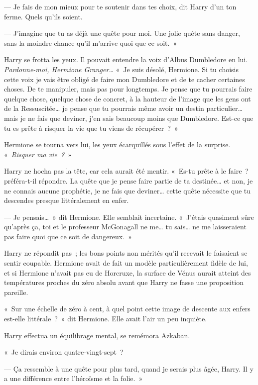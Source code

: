 --- Je fais de mon mieux pour te soutenir dans tes choix, dit Harry d'un ton ferme.
Quels qu'ils soient.

--- J'imagine que tu as déjà une quête pour moi.
Une jolie quête sans danger, sans la moindre chance qu'il m'arrive quoi que ce soit.~»

Harry se frotta les yeux.
Il pouvait entendre la voix d'Albus Dumbledore en lui.
\emph{Pardonne-moi, Hermione Granger…} «~Je suis désolé, Hermione.
Si tu choisis cette voix je vais être obligé de faire mon Dumbledore et de te cacher certaines choses.
De te manipuler, mais pas pour longtemps.
Je pense que tu pourrais faire quelque chose, quelque chose de concret, à la hauteur de l'image que les gens ont de la Ressuscitée… je pense que tu pourrais même avoir un destin particulier… mais je ne fais que deviner, j'en sais beaucoup moins que Dumbledore.
Est-ce que tu es prête à risquer la vie que tu viens de récupérer~?~»

Hermione se tourna vers lui, les yeux écarquillés sous l'effet de la surprise.
«~\emph{Risquer ma vie~?}~»

Harry ne hocha pas la tête, car cela aurait été mentir.
«~Es-tu prête à le faire~? préféra-t-il répondre.
La quête que je pense faire partie de ta destinée… et non, je ne connais aucune prophétie, je ne fais que deviner… cette quête nécessite que tu descendes presque littéralement en enfer.

--- Je pensais…~»
dit Hermione.
Elle semblait incertaine.
«~J'étais quasiment sûre qu'après ça, toi et le professeur McGonagall ne me… tu sais… ne me laisseraient pas faire quoi que ce soit de dangereux.~»

Harry ne répondit pas~; les bons points non mérités qu'il recevait le faisaient se sentir coupable.
Hermione avait de fait un modèle particulièrement fidèle de lui, et si Hermione n'avait pas eu de Horcruxe, la surface de Vénus aurait atteint des températures proches du zéro absolu avant que Harry ne fasse une proposition pareille.

«~Sur une échelle de zéro à cent, à quel point cette image de descente aux enfers est-elle littérale~?~»
dit Hermione.
Elle avait l'air un peu inquiète.

Harry effectua un équilibrage mental, se remémora Azkaban.

«~Je dirais environ quatre-vingt-sept~?

--- Ça ressemble à une quête pour plus tard, quand je serais plus âgée, Harry.
Il y a une différence entre l'héroïsme et la folie.~»

